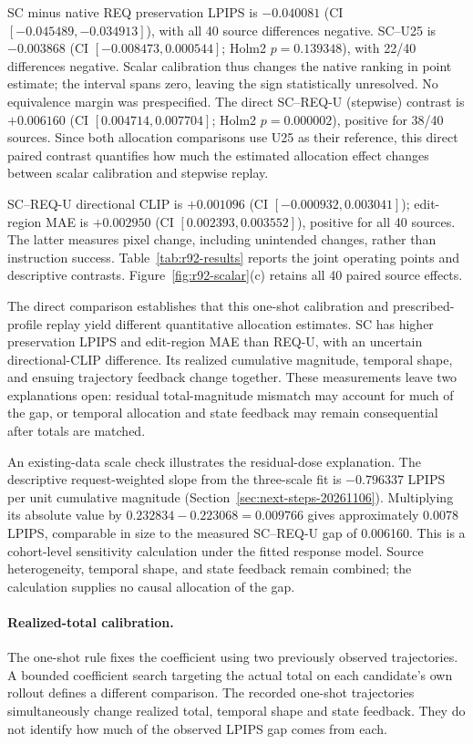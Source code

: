 \documentclass[10pt,doubleanonymous]{ieeeconf}
\begin{document}
SC minus native REQ preservation LPIPS is $-0.040081$ (CI $[-0.045489,-0.034913]$), with all 40 source differences negative. SC--U25 is $-0.003868$ (CI $[-0.008473,0.000544]$; Holm2 $p=0.139348$), with 22/40 differences negative. Scalar calibration thus changes the native ranking in point estimate; the interval spans zero, leaving the sign statistically unresolved. No equivalence margin was prespecified. The direct SC--REQ-U (stepwise) contrast is $+0.006160$ (CI $[0.004714,0.007704]$; Holm2 $p=0.000002$), positive for 38/40 sources. Since both allocation comparisons use U25 as their reference, this direct paired contrast quantifies how much the estimated allocation effect changes between scalar calibration and stepwise replay.

SC--REQ-U directional CLIP is $+0.001096$ (CI $[-0.000932,0.003041]$); edit-region MAE is $+0.002950$ (CI $[0.002393,0.003552]$), positive for all 40 sources. The latter measures pixel change, including unintended changes, rather than instruction success. Table~\ref{tab:r92-results} reports the joint operating points and descriptive contrasts. Figure~\ref{fig:r92-scalar}(c) retains all 40 paired source effects.

The direct comparison establishes that this one-shot calibration and prescribed-profile replay yield different quantitative allocation estimates. SC has higher preservation LPIPS and edit-region MAE than REQ-U, with an uncertain directional-CLIP difference. Its realized cumulative magnitude, temporal shape, and ensuing trajectory feedback change together. These measurements leave two explanations open: residual total-magnitude mismatch may account for much of the gap, or temporal allocation and state feedback may remain consequential after totals are matched.

An existing-data scale check illustrates the residual-dose explanation. The descriptive request-weighted slope from the three-scale fit is $-0.796337$ LPIPS per unit cumulative magnitude (Section~\ref{sec:next-steps-20261106}). Multiplying its absolute value by $0.232834-0.223068=0.009766$ gives approximately 0.0078 LPIPS, comparable in size to the measured SC--REQ-U gap of 0.006160. This is a cohort-level sensitivity calculation under the fitted response model. Source heterogeneity, temporal shape, and state feedback remain combined; the calculation supplies no causal allocation of the gap.

\paragraph{Realized-total calibration.}
The one-shot rule fixes the coefficient using two previously observed trajectories. A bounded coefficient search targeting the actual total on each candidate's own rollout defines a different comparison. The recorded one-shot trajectories simultaneously change realized total, temporal shape and state feedback. They do not identify how much of the observed LPIPS gap comes from each.
\end{document}
